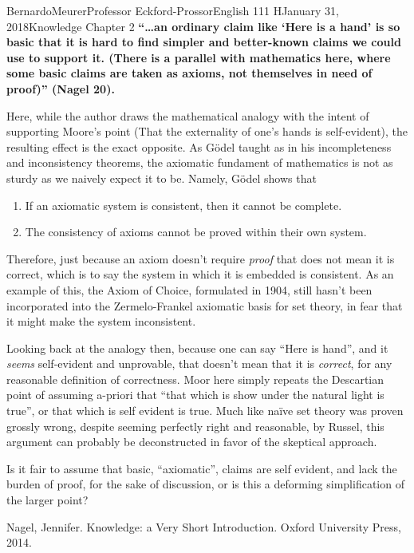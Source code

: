 \documentclass[12pt,letterpaper]{article}
\begin{document}
\begin{mla}{Bernardo}{Meurer}{Professor Eckford-Prossor}{English 111 H}{January 31, 2018}{Knowledge Chapter 2}
    \textbf{``\ldots an ordinary claim like `Here is a hand' is so basic that it is hard to find simpler and better-known claims we could use to support it. (There is a parallel with mathematics here, where some basic claims are taken as axioms, not themselves in need of proof)'' (Nagel 20).}
    \vspace{10pt}


    Here, while the author draws the mathematical analogy with the intent of supporting Moore's point (That the externality of one's hands is self-evident), the resulting effect is the exact opposite. As Gödel taught as in his incompleteness and inconsistency theorems, the axiomatic fundament of mathematics is not as sturdy as we naively expect it to be. Namely, Gödel shows that
    \begin{enumerate}
        \item If an axiomatic system is consistent, then it cannot be complete.
        \item The consistency of axioms cannot be proved within their own system.
    \end{enumerate}
    Therefore, just because an axiom doesn't require \emph{proof} that does not mean it is correct, which is to say the system in which it is embedded is consistent. As an example of this, the Axiom of Choice, formulated in 1904, still hasn't been incorporated into the Zermelo-Frankel axiomatic basis for set theory, in fear that it might make the system inconsistent.

    Looking back at the analogy then, because one can say ``Here is hand'', and it \emph{seems} self-evident and unprovable, that doesn't mean that it is \emph{correct}, for any reasonable definition of correctness. Moor here simply repeats the Descartian point of assuming a-priori that ``that which is show under the natural light is true'', or that which is self evident is true. Much like naïve set theory was proven grossly wrong, despite seeming perfectly right and reasonable, by Russel, this argument can probably be deconstructed in favor of the skeptical approach.

    Is it fair to assume that basic, ``axiomatic'', claims are self evident, and lack the burden of proof, for the sake of discussion, or is this a deforming simplification of the larger point?

    \begin{workscited}
        \bibent Nagel, Jennifer. Knowledge: a Very Short Introduction. Oxford University Press, 2014.
    \end{workscited}
\end{mla}
\end{document}
